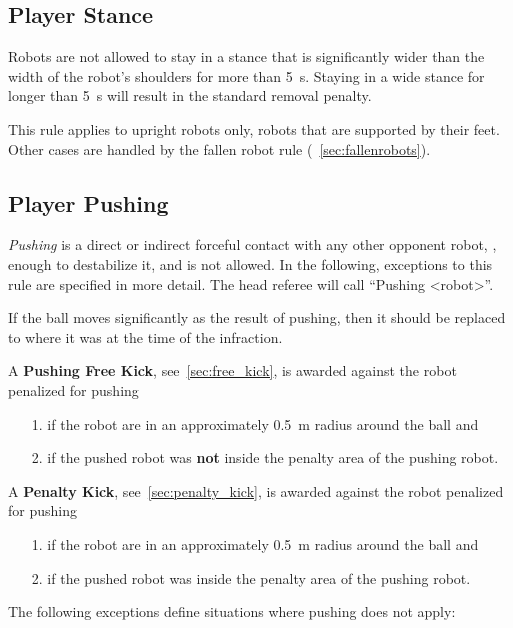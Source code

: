 \subsection{Player Stance}
\label{sec:player_stance}

Robots are not allowed to stay in a stance that is significantly wider than the width of the robot's shoulders for more than \qty{5}{\second}.
Staying in a wide stance for longer than \qty{5}{\second} will result in the standard removal penalty.

This rule applies to upright robots only, \ie robots that are supported by their feet.
Other cases are handled by the fallen robot rule (\cf~\cref{sec:fallenrobots}).

\subsection{Player Pushing}
\label{sec:player_pushing}

\emph{Pushing} is a direct or indirect forceful contact with any other opponent robot, \ie, enough to destabilize it, and is not allowed. In the following, exceptions to this rule are specified in more detail.
The head referee will call ``Pushing \textless robot\textgreater''.

If the ball moves significantly as the result of pushing, then it should be replaced to where it was at the time of the infraction.

A \textbf{Pushing Free Kick}, see~\cref{sec:free_kick}, is awarded against the robot penalized for pushing
\begin{itemize}
  \item[1.] if the robot are in an approximately \qty{0.5}{\metre} radius around the ball and
  \item[2.] if the pushed robot was \textbf{not} inside the penalty area of the pushing robot.
\end{itemize}

A \textbf{Penalty Kick}, see~\cref{sec:penalty_kick}, is awarded against the robot penalized for pushing
\begin{itemize}
  \item[1.] if the robot are in an approximately \qty{0.5}{\metre} radius around the ball and
  \item[2.] if the pushed robot was inside the penalty area of the pushing robot.
\end{itemize}

The following exceptions define situations where pushing does not apply:


